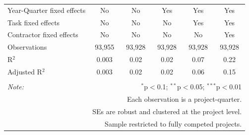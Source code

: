 \documentclass[
]{article}
\begin{document}
\begin{table}[H]
\begin{tabular}{@{\extracolsep{-2pt}}lccccc}
Year-Quarter fixed effects & No & No & Yes & Yes & Yes \\ 
Task fixed effects & No & No & No & Yes & Yes \\ 
Contractor fixed effects & No & No & No & No & Yes \\ 
Observations & 93,955 & 93,928 & 93,928 & 93,928 & 93,928 \\ 
R$^{2}$ & 0.003 & 0.02 & 0.02 & 0.07 & 0.22 \\ 
Adjusted R$^{2}$ & 0.003 & 0.02 & 0.02 & 0.06 & 0.15 \\ 
\hline 
\hline \\[-1.8ex] 
\textit{Note:}  & \multicolumn{5}{r}{$^{*}$p$<$0.1; $^{**}$p$<$0.05; $^{***}$p$<$0.01} \\ 
 & \multicolumn{5}{r}{Each observation is a project-quarter.} \\ 
 & \multicolumn{5}{r}{SEs are robust and clustered at the project level.} \\ 
 & \multicolumn{5}{r}{Sample restricted to fully competed projects.} \\ 
\end{tabular} 
\end{table}
\end{document}
